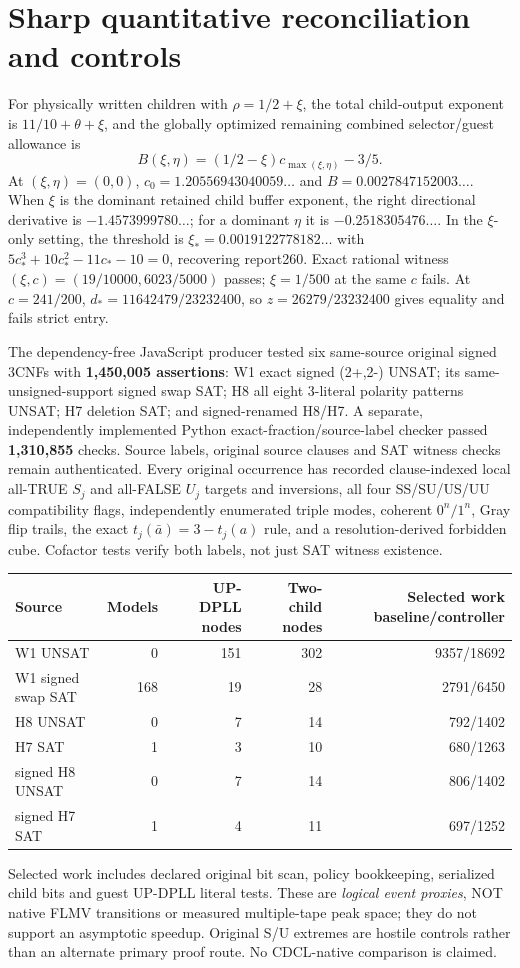 \documentclass[11pt]{article}
\begin{document}
\section{Sharp quantitative reconciliation and controls}
For physically written children with $\rho=1/2+\xi$, the total child-output exponent is $11/10+\theta+\xi$, and the globally optimized remaining combined selector/guest allowance is
\[
B(\xi,\eta)=(1/2-\xi)c_{\max(\xi,\eta)}-3/5.
\]
At $(\xi,\eta)=(0,0)$, $c_0=1.20556943040059\ldots$ and $B=0.0027847152003\ldots$. When $\xi$ is the dominant retained child buffer exponent, the right directional derivative is $-1.4573999780\ldots$; for a dominant $\eta$ it is $-0.2518305476\ldots$. In the $\xi$-only setting, the threshold is $\xi_*=0.0019122778182\ldots$ with $5c_*^3+10c_*^2-11c_*-10=0$, recovering report260. Exact rational witness $(\xi,c)=(19/10000,6023/5000)$ passes; $\xi=1/500$ at the same $c$ fails. At $c=241/200$, $d_*=11642479/23232400$, so $z=26279/23232400$ gives equality and fails strict entry.

The dependency-free JavaScript producer tested six same-source original signed 3CNFs with \textbf{1,450,005 assertions}: W1 exact signed (2+,2-) UNSAT; its same-unsigned-support signed swap SAT; H8 all eight 3-literal polarity patterns UNSAT; H7 deletion SAT; and signed-renamed H8/H7. A separate, independently implemented Python exact-fraction/source-label checker passed \textbf{1,310,855} checks. Source labels, original source clauses and SAT witness checks remain authenticated. Every original occurrence has recorded clause-indexed local all-TRUE $S_j$ and all-FALSE $U_j$ targets and inversions, all four SS/SU/US/UU compatibility flags, independently enumerated triple modes, coherent $0^n/1^n$, Gray flip trails, the exact $t_j(\bar a)=3-t_j(a)$ rule, and a resolution-derived forbidden cube. Cofactor tests verify both labels, not just SAT witness existence.

\begin{center}\begin{tabular}{lrrrr}
\toprule
Source & Models & UP-DPLL nodes & Two-child nodes & Selected work baseline/controller\\
\midrule
W1 UNSAT &0&151&302&9357/18692\\
W1 signed swap SAT &168&19&28&2791/6450\\
H8 UNSAT &0&7&14&792/1402\\
H7 SAT &1&3&10&680/1263\\
signed H8 UNSAT &0&7&14&806/1402\\
signed H7 SAT &1&4&11&697/1252\\
\bottomrule
\end{tabular}\end{center}
Selected work includes declared original bit scan, policy bookkeeping, serialized child bits and guest UP-DPLL literal tests. These are \emph{logical event proxies}, NOT native FLMV transitions or measured multiple-tape peak space; they do not support an asymptotic speedup. Original S/U extremes are hostile controls rather than an alternate primary proof route. No CDCL-native comparison is claimed.
\end{document}
